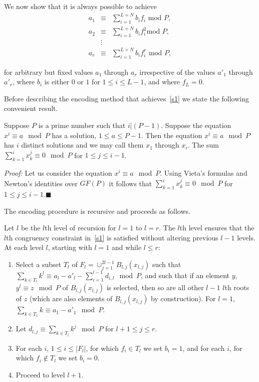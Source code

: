  We now show that it is always possible to achieve
\begin{equation}\label{s1}\begin{array}{ccc} a_1 &\equiv& \sum_{i=1}^{L+N} b_i f_i
\text{ mod } P, \\ a_2 &\equiv& \sum_{i=1}^{L+N} b_i f_i^2 \text{
mod } P,\\ &\vdots& \\
a_r &\equiv& \sum_{i=1}^{L+N} b_i f_i^r \text{ mod }
P,\end{array}\end{equation}

for arbitrary but fixed values $a_1$ through $a_r$ irrespective of
the values ${a'}_1$ through ${a'}_r$, where $b_i$ is either $0$ or
$1$ for $1 \leq i \leq L-1$, and where $f_L=0$.

Before describing the encoding method that achieves~\eqref{s1} we
state the following convenient result.

\begin{lemma}\label{sums} Suppose $P$ is a prime number such that $i|(P-1)$. Suppose the
equation $x^i\equiv a \mod P$ has a solution, $1 \leq a \leq P-1$.
Then the equation $x^i\equiv a \mod P$ has $i$ distinct solutions
\cite{apostol} and we may call them $x_1$ through $x_i$. The sum
$\sum_{k=1}^i x_k^j \equiv 0 \mod P$ for $1 \leq j \leq i-1$.
\end{lemma}
\noindent \textit{Proof:} Let us consider the equation $x^i \equiv a
\mod P$. Using Vieta's formulas and Newton's identities over $GF(P)$
it follows that
 $\sum_{k=1}^i x_k^j \equiv 0 \mod P$ for $1 \leq j \leq
i-1$.\hfill$\blacksquare$

The encoding procedure is recursive and proceeds as follows.

Let $l$ be the $l$th level of recursion for $l=1$ to $l=r$. The
$l$th level ensures that the $l$th congruency constraint
in~\eqref{s1} is satisfied without altering previous $l-1$ levels.
 At each level $l$, starting with $l=1$ and while $l \leq r$:
\begin{enumerate}
 \item Select a subset $T_{l}$ of $F_l=\cup_{j=1}^{2l-1} B_{l,j}(x_{l,j})$ such that $\sum_{k \in T_l} k^l \equiv a_l - {a'}_l -
\sum_{i=1}^{l-1} d_{i,l} \mod P$, and such that if an element $y$,
$y^l \equiv z \mod P$ of $B_{l,j}(x_{l,j})$ is selected, then so are
all other $l-1$ $l$th roots of $z$ (which are also elements of
$B_{l,j}(x_{l,j})$ by construction). For $l=1$, $\sum_{k \in T_1} k
\equiv a_1 - {a'}_1 \mod P$.\item Let $d_{l,j} \equiv \sum_{k \in
T_l} k^j \mod P$ for $l+1 \leq j\leq r$.
\item For each $i$, $1 \leq i \leq |F_l|$, for which $f_i \in T_l$
we set $b_i=1$, and for each $i$, for which $f_i \notin T_l$ we set
$b_i=0$. \item Proceed to level $l+1$.
\end{enumerate}

